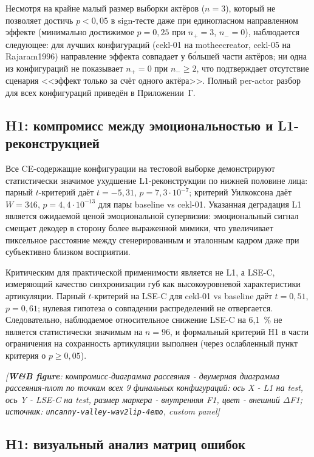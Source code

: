 \documentclass[a4paper, 12pt, oneside, openany]{article}
\begin{document}
Несмотря на крайне малый размер выборки актёров ($n=3$), который не позволяет достичь $p<0{,}05$ в sign-тесте даже при единогласном направленном эффекте (минимально достижимое $p=0{,}25$ при $n_+=3$, $n_-=0$), наблюдается следующее: для лучших конфигураций (cekl-01 на motheecreator, cekl-05 на Rajaram1996) направление эффекта совпадает у б\'ольшей части актёров; ни одна из конфигураций не показывает $n_+=0$ при $n_-\geq2$, что подтверждает отсутствие сценария <<эффект только за счёт одного актёра>>. Полный per-actor разбор для всех конфигураций приведён в Приложении~Г.

\subsection{H1: компромисс между эмоциональностью и L1-реконструкцией}

Все CE-содержащие конфигурации на тестовой выборке демонстрируют статистически значимое ухудшение L1-реконструкции по нижней половине лица: парный $t$-критерий даёт $t=-5{,}31$, $p=7{,}3\!\cdot\!10^{-7}$; критерий Уилкоксона даёт $W=346$, $p=4{,}4\!\cdot\!10^{-13}$ для пары baseline vs cekl-01. Указанная деградация L1 является ожидаемой ценой эмоциональной супервизии: эмоциональный сигнал смещает декодер в сторону более выраженной мимики, что увеличивает пиксельное расстояние между сгенерированным и эталонным кадром даже при субъективно близком восприятии.

Критическим для практической применимости является не L1, а LSE-C, измеряющий качество синхронизации губ как высокоуровневой характеристики артикуляции. Парный $t$-критерий на LSE-C для cekl-01 vs baseline даёт $t=0{,}51$, $p=0{,}61$; нулевая гипотеза о совпадении распределений не отвергается. Следовательно, наблюдаемое относительное снижение LSE-C на 6,1~\% не является статистически значимым на $n=96$, и формальный критерий H1 в части ограничения на сохранность артикуляции выполнен (через ослабленный пункт критерия о $p \geq 0{,}05$).

\begin{center}
\textit{[\textbf{W\&B figure}: компромисс-диаграмма рассеяния - двумерная диаграмма рассеяния-плот по точкам всех 9 финальных конфигураций: ось X - L1 на test, ось Y - LSE-C на test, размер маркера - внутренняя F1, цвет - внешний $\Delta$F1; источник: \texttt{uncanny-valley-wav2lip-4emo}, custom panel]}
\end{center}

\subsection{H1: визуальный анализ матриц ошибок}
\end{document}
